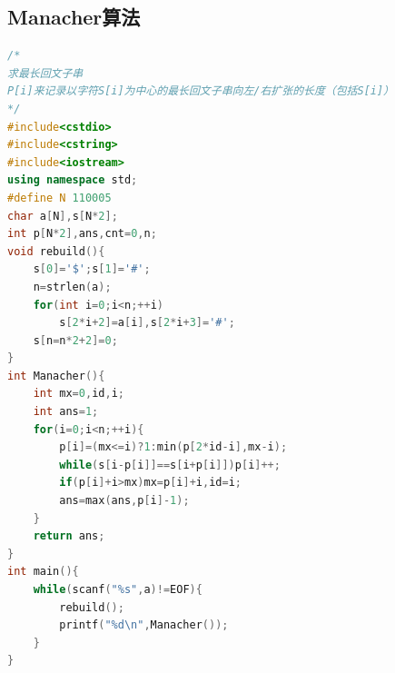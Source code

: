 \documentclass[UTF8,a4paper,titlepage]{ctexart}
\begin{document}
  \subsection{Manacher算法}
	  \begin{lstlisting}[language=C++]
/*
求最长回文子串
P[i]来记录以字符S[i]为中心的最长回文子串向左/右扩张的长度（包括S[i]）
*/
#include<cstdio>
#include<cstring>
#include<iostream>
using namespace std;
#define N 110005 
char a[N],s[N*2];
int p[N*2],ans,cnt=0,n;
void rebuild(){
    s[0]='$';s[1]='#';
    n=strlen(a);
    for(int i=0;i<n;++i)
        s[2*i+2]=a[i],s[2*i+3]='#';
    s[n=n*2+2]=0;
}
int Manacher(){
    int mx=0,id,i;
    int ans=1; 
    for(i=0;i<n;++i){
        p[i]=(mx<=i)?1:min(p[2*id-i],mx-i);
        while(s[i-p[i]]==s[i+p[i]])p[i]++;
        if(p[i]+i>mx)mx=p[i]+i,id=i;
        ans=max(ans,p[i]-1);
    }
    return ans;
}
int main(){
    while(scanf("%s",a)!=EOF){
        rebuild();
        printf("%d\n",Manacher());
    }
}
	  \end{lstlisting}
\end{document}
